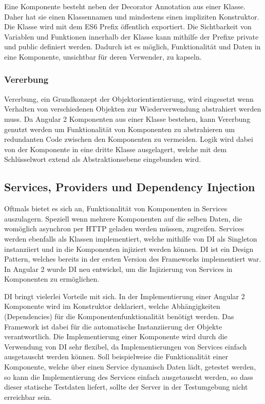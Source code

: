 Eine Komponente besteht neben der Decorator Annotation aus einer Klasse.
Daher hat sie einen Klassennamen und mindestens einen impliziten Konstruktor.
Die Klasse wird mit dem ES6 Prefix öffentlich exportiert. Die Sichtbarkeit von Variablen und Funktionen
innerhalb der Klasse kann mithilfe der Prefixe private und public definiert werden.
Dadurch ist es möglich, Funktionalität und Daten in eine Komponente, unsichtbar für deren Verwender, zu kapseln.

\vspace{1cm}

\vspace{1cm}


\subsubsection{Vererbung}

Vererbung, ein Grundkonzept der Objektorientientierung,
wird eingesetzt wenn Verhalten von verschiedenen Objekten zur Wiederverwendung
abstrahiert werden muss. Da Angular 2 Komponenten aus einer Klasse bestehen,
kann Vererbung genutzt werden um Funktionalität von Komponenten zu abstrahieren
um redundanten Code zwischen den Komponenten
zu vermeiden. Logik wird dabei von der Komponente in eine dritte Klasse ausgelagert,
welche mit dem Schlüsselwort extend als
Abstraktionsebene eingebunden wird. \cite{DanWa45:online}


\subsection{Services, Providers und Dependency Injection}

Oftmals bietet es sich an, Funktionalität von Komponenten in Services auszulagern.
Speziell wenn mehrere Komponenten auf die selben Daten,
die womöglich asynchron per HTTP geladen werden müssen, zugreifen.
Services werden ebenfalls als Klassen implementiert, welche mithilfe von \ac{DI}
als Singleton instanziiert und in die Komponenten injiziert werden können.
\ac{DI} ist ein Design Pattern, welches bereits in der ersten Version des Frameworks implementiert war.
In Angular 2 wurde \ac{DI} neu entwickel, um die Injizierung von Services in Komponenten zu ermöglichen.

\ac{DI} bringt vielerlei Vorteile mit sich. In der Implementierung einer Angular 2 Komponente wird im
Konstruktor deklariert, welche Abhängigkeiten (Dependencies) für die Komponentenfunktionalität benötigt werden.
Das Framework ist dabei für die automatische Instanziierung der Objekte verantwortlich.
Die Implementierung einer Komponente wird durch die Verwendung von \ac{DI} sehr flexibel,
da Implementierungen von Services einfach ausgetauscht werden können.
Soll beispielweise die Funktionalität einer Komponente, welche über einen Service dynamisch Daten lädt, getestet werden,
so kann die Implementierung des Services einfach ausgetauscht werden, so dass dieser statische Testdaten liefert,
sollte der Server in der Testumgebung nicht erreichbar sein.
\cite[281]{Angular2}


